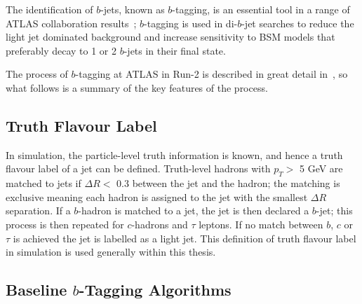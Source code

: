 The identification of $b$-jets, known as $b$-tagging, is an essential tool in a range of ATLAS collaboration results~\cite{obj-ttbar,obj-Hbb};
$b$-tagging is used in di-$b$-jet searches to reduce the light jet dominated background and increase 
sensitivity to BSM models that preferably decay to 1 or 2 $b$-jets in their final state.

The process of $b$-tagging at ATLAS in Run-2 is described in great
detail in~\cite{obj-bjets_algo_2015,obj-bjets_algo_2016},
so what follows is a summary of the key features of the process.

\subsection{Truth Flavour Label}
\label{sec:obj-bjets_label}

In simulation, the particle-level truth information is known, and hence a truth flavour label of a jet can be defined.
Truth-level hadrons with $p_{T} >$ 5 GeV are matched to jets if $\Delta R <$ 0.3 between the jet and the hadron;
the matching is exclusive meaning each hadron is assigned to the jet with the smallest $\Delta R$ separation.
If a $b$-hadron is matched to a jet, the jet is then declared a $b$-jet;
this process is then repeated for $c$-hadrons and $\tau$ leptons.
If no match between $b$, $c$ or $\tau$ is achieved the jet is labelled as a light jet.
This definition of truth flavour label in simulation is used generally within this thesis.

   
\subsection{Baseline $b$-Tagging Algorithms}

